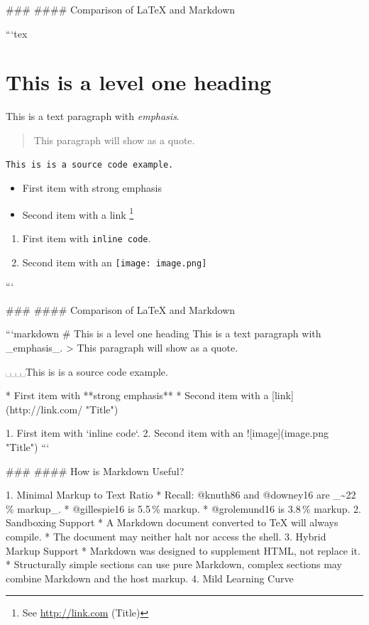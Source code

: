\documentclass{beamer}
\begin{document}
\begin{frame}

### \subsecname
#### Comparison of \LaTeX{} and Markdown

\footnotesize
```tex
\section{This is a level one heading}
This is a text paragraph with \emph{emphasis}.
\begin{quotation}This paragraph will show as a quote.\end{quotation}
\begin{verbatim}
This is is a source code example.
\end{verbatim}
\begin{itemize}
  \item First item with \alert{strong emphasis}
  \item Second item with a link%
    \footnote{See \url{http://link.com} (Title)}
\end{itemize}
\begin{enumerate}
  \item First item with \verb`inline code`.
  \item Second item with an \texttt{[image: image.png]}
\end{enumerate}
```

\end{frame}
\begin{frame}

### \subsecname
#### Comparison of \LaTeX{} and Markdown

```markdown
# This is a level one heading
This is a text paragraph with _emphasis_.
> This paragraph will show as a quote.

␣␣␣␣This is is a source code example.

* First item with **strong emphasis**
* Second item with a [link](http://link.com/ "Title")

1. First item with `inline code`.
2. Second item with an ![image](image.png "Title")
```

\end{frame}
\begin{frame}

### \subsecname
#### How is Markdown Useful?

  1. Minimal Markup to Text Ratio
    * Recall: @knuth86 and @downey16 are _\textasciitilde 22\,\% markup_.
    * @gillespie16 is 5.5\,\% markup.
    * @grolemund16 is 3.8\,\% markup.
  2. Sandboxing Support
    * A Markdown document converted to \TeX{} will always compile.
    * The document may neither halt nor access the shell.
  3. Hybrid Markup Support
    * Markdown was designed to supplement HTML, not replace it.
    * Structurally simple sections can use pure Markdown, complex sections
      may combine Markdown and the host markup.
  4. Mild Learning Curve

\end{frame}
\end{document}
